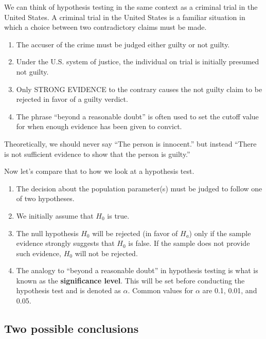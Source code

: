 \documentclass[12pt, krantz2,]{krantz}
\begin{document}
We can think of hypothesis testing in the same context as a criminal trial in the United States. A criminal trial in the United States is a familiar situation in which a choice between two contradictory claims must be made.

\begin{enumerate}
\def\labelenumi{\arabic{enumi}.}
\item
  The accuser of the crime must be judged either guilty or not guilty.
\item
  Under the U.S. system of justice, the individual on trial is initially presumed not guilty.
\item
  Only STRONG EVIDENCE to the contrary causes the not guilty claim to be rejected in favor of a guilty verdict.
\item
  The phrase ``beyond a reasonable doubt'' is often used to set the cutoff value for when enough evidence has been given to convict.
\end{enumerate}

Theoretically, we should never say ``The person is innocent.'' but instead ``There is not sufficient evidence to show that the person is guilty.''

Now let's compare that to how we look at a hypothesis test.

\begin{enumerate}
\def\labelenumi{\arabic{enumi}.}
\item
  The decision about the population parameter(s) must be judged to follow one of two hypotheses.
\item
  We initially assume that \(H_0\) is true.
\item
  The null hypothesis \(H_0\) will be rejected (in favor of \(H_a\)) only if the sample evidence strongly suggests that \(H_0\) is false. If the sample does not provide such evidence, \(H_0\) will not be rejected.
\item
  The analogy to ``beyond a reasonable doubt'' in hypothesis testing is what is known as the \textbf{significance level}. This will be set before conducting the hypothesis test and is denoted as \(\alpha\). Common values for \(\alpha\) are 0.1, 0.01, and 0.05.
\end{enumerate}

\hypertarget{two-possible-conclusions}{%
\subsection{Two possible conclusions}\label{two-possible-conclusions}}
\end{document}
